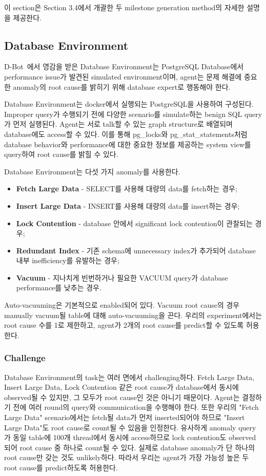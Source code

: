 이 section은 Section 3.4에서 개괄한 두 milestone generation method의 자세한 설명을 제공한다.

\subsection{Database Environment}
\label{app:database-scenario}

D-Bot~\cite{dbot}에서 영감을 받은 Database Environment는 PostgreSQL Database에서 performance issue가 발견된 simulated environment이며, agent는 문제 해결에 중요한 anomaly의 root cause를 밝히기 위해 database expert로 행동해야 한다.

Database Environment는 docker에서 실행되는 PostgreSQL을 사용하여 구성된다. Improper query가 수행되기 전에 다양한 scenario를 simulate하는 benign SQL query가 먼저 실행된다. Agent는 서로 talk할 수 있는 graph structure로 배열되며 database에도 access할 수 있다. 이를 통해 pg\_locks와 pg\_stat\_statements처럼 database behavior와 performance에 대한 중요한 정보를 제공하는 system view를 query하여 root cause를 밝힐 수 있다.

Database Environment는 다섯 가지 anomaly를 사용한다.
\begin{itemize}
    \item \textbf{Fetch Large Data} - SELECT를 사용해 대량의 data를 fetch하는 경우;
    \item \textbf{Insert Large Data} - INSERT를 사용해 대량의 data를 insert하는 경우;
    \item \textbf{Lock Contention} - database 안에서 significant lock contention이 관찰되는 경우;
    \item \textbf{Redundant Index} - 기존 schema에 unnecessary index가 추가되어 database 내부 inefficiency를 유발하는 경우;
    \item \textbf{Vacuum} - 지나치게 빈번하거나 필요한 VACUUM query가 database performance를 낮추는 경우.
\end{itemize}

Auto-vacuuming은 기본적으로 enabled되어 있다. Vacuum root cause의 경우 manually vacuum될 table에 대해 auto-vacuuming을 끈다. 우리의 experiment에서는 root cause 수를 1로 제한하고, agent가 2개의 root cause를 predict할 수 있도록 허용한다.

\subsubsection{Challenge}

Database Environment의 task는 여러 면에서 challenging하다. Fetch Large Data, Insert Large Data, Lock Contention 같은 root cause가 database에서 동시에 observed될 수 있지만, 그 모두가 root cause인 것은 아니기 때문이다. Agent는 결정하기 전에 여러 round의 query와 communication을 수행해야 한다. 또한 우리의 "Fetch Large Data" scenario에서는 fetch될 data가 먼저 inserted되어야 하므로 "Insert Large Data"도 root cause로 count될 수 있음을 인정한다. 유사하게 anomaly query가 동일 table에 100개 thread에서 동시에 access하므로 lock contention도 observed되어 root cause 중 하나로 count될 수 있다. 실제로 database anomaly가 단 하나의 root cause만 갖는 것도 unlikely하다. 따라서 우리는 agent가 가장 가능성 높은 두 root cause를 predict하도록 허용한다.

